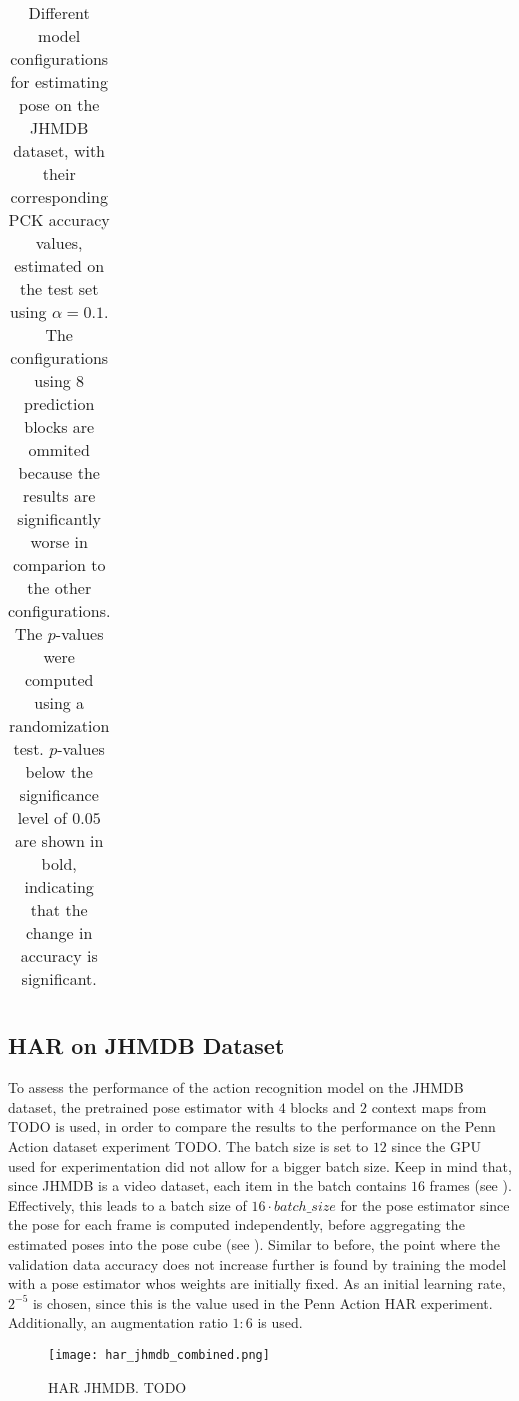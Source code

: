 \begin{table}[]
\begin{tabular}{|l|l|c|c|}
    \end{tabular}
    \caption{Different model configurations for estimating pose on the JHMDB dataset, with their corresponding PCK accuracy values, estimated on the test set using $\alpha = 0.1$. The configurations using $8$ prediction blocks are ommited because the results are significantly worse in comparion to the other configurations. The $p$-values were computed using a randomization test. $p$-values below the significance level of $0.05$ are shown in bold, indicating that the change in accuracy is significant.}
    \label{tab:jhmdb_results_confidence}
\end{table}




\subsection{HAR on JHMDB Dataset}
To assess the performance of the action recognition model on the JHMDB dataset, the pretrained pose estimator with $4$ blocks and $2$ context maps from TODO is used, in order to compare the results to the performance on the Penn Action dataset experiment TODO.
The batch size is set to $12$ since the GPU used for experimentation did not allow for a bigger batch size.
Keep in mind that, since JHMDB is a video dataset, each item in the batch contains $16$ frames (see ).
Effectively, this leads to a batch size of $16 \cdot batch\_size$ for the pose estimator since the pose for each frame is computed independently, before aggregating the estimated poses into the pose cube (see ).
Similar to before, the point where the validation data accuracy does not increase further is found by training the model with a pose estimator whos weights are initially fixed.
As an initial learning rate, $2^{-5}$ is chosen, since this is the value used in the Penn Action HAR experiment.
Additionally, an augmentation ratio $1:6$ is used.


\begin{figure}[htb!]
    \centering
    \texttt{[image: har\_jhmdb\_combined.png]}
    \caption{HAR JHMDB. TODO}
    \label{fig:har_jhmdb_combined}
\end{figure}

